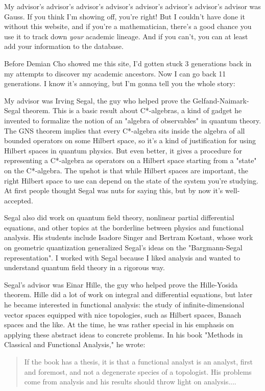 My advisor's advisor's advisor's advisor's advisor's advisor's
advisor's advisor was Gauss.  If you think I'm showing off, you're
right!  But I couldn't have done it without this website, and if
you're a mathematician, there's a good chance you use it to track 
down \emph{your} academic lineage.  And if you can't, you can at least 
add your information to the database.

Before Demian Cho showed me this site, I'd gotten stuck 3 generations
back in my attempts to discover my academic ancestors.  Now I can go
back 11 generations.  I know it's annoying, but I'm gonna tell you the
whole story:

My advisor was Irving Segal, the guy who helped prove the
Gelfand-Naimark-Segal theorem.  This is a basic result about
C*-algebras, a kind of gadget he invented to formalize the notion of
an "algebra of observables" in quantum theory.  The GNS theorem
implies that every C*-algebra sits inside the algebra of all bounded
operators on some Hilbert space, so it's a kind of justification for
using Hilbert spaces in quantum physics.  But even better, it gives a
procedure for representing a C*-algebra as operators on a Hilbert
space starting from a "state" on the C*-algebra.  The upshot is that
while Hilbert spaces are important, the right Hilbert space to use can
depend on the state of the system you're studying.  At first people 
thought Segal was nuts for saying this, but by now it's well-accepted.

Segal also did work on quantum field theory, nonlinear partial
differential equations, and other topics at the borderline between
physics and functional analysis.  His students include Isadore Singer
and Bertram Kostant, whose work on geometric quantization generalized
Segal's ideas on the "Bargmann-Segal representation".  I worked with
Segal because I liked analysis and wanted to understand quantum field
theory in a rigorous way.  

Segal's advisor was Einar Hille, the guy who helped prove the
Hille-Yosida theorem.  Hille did a lot of work on integral and
differential equations, but later he became interested in functional
analysis: the study of infinite-dimensional vector spaces equipped
with nice topologies, such as Hilbert spaces, Banach spaces and the
like.  At the time, he was rather special in his emphasis on applying
these abstract ideas to concrete problems.  In his book "Methods in
Classical and Functional Analysis," he wrote:

\begin{quote}
     If the book has a thesis, it is that a functional analyst is an
     analyst, first and foremost, and not a degenerate species of a
     topologist.  His problems come from analysis and his results 
     should throw light on analysis....
\end{quote}
    
